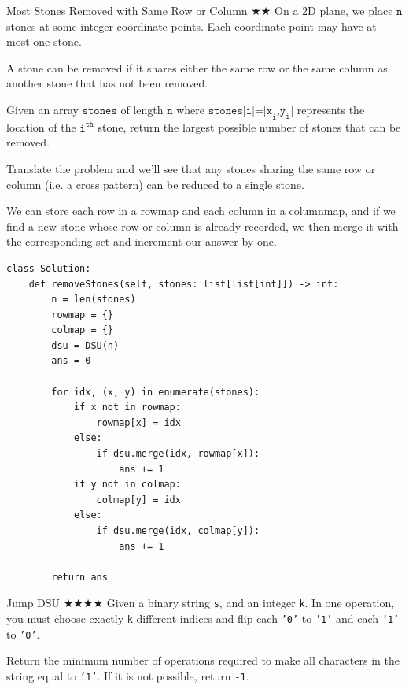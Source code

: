 \documentclass{article}
\begin{document}
\begin{Question}{Most Stones Removed with Same Row or Column $\bigstar\bigstar$}
On a 2D plane, we place $\texttt n$ stones at some integer coordinate points. Each coordinate point may have at most one stone.

A stone can be removed if it shares either the same row or the same column as another stone that has not been removed.

Given an array $\texttt{stones}$ of length $\texttt n$ where $\texttt{stones[i]=[x}_\texttt{i}\texttt{,y}_\texttt{i}\texttt{]}$ represents the location of the $\texttt i^{\texttt{th}}$ stone, return the largest possible number of stones that can be removed.
\end{Question}

Translate the problem and we'll see that any stones sharing the same row or column (i.e. a cross pattern) can be reduced to a single stone.

We can store each row in a rowmap and each column in a columnmap, and if we find a new stone whose row or column is already recorded, we then merge it with the corresponding set and increment our answer by one.

\begin{lstlisting}[style=python]
class Solution:
    def removeStones(self, stones: list[list[int]]) -> int:
        n = len(stones)
        rowmap = {}
        colmap = {}
        dsu = DSU(n)
        ans = 0
        
        for idx, (x, y) in enumerate(stones):
            if x not in rowmap:
                rowmap[x] = idx
            else:
                if dsu.merge(idx, rowmap[x]):
                    ans += 1
            if y not in colmap:
                colmap[y] = idx
            else:
                if dsu.merge(idx, colmap[y]):
                    ans += 1
                    
        return ans
\end{lstlisting}

\begin{Question}{Jump DSU $\bigstar\bigstar\bigstar\bigstar$}
Given a binary string \texttt{s}, and an integer \texttt{k}. In one operation, you must choose exactly \texttt{k} different indices and flip each \texttt{'0'} to \texttt{'1'} and each \texttt{'1'} to \texttt{'0'}.

Return the minimum number of operations required to make all characters in the string equal to \texttt{'1'}. If it is not possible, return \texttt{-1}.
\end{Question}
\end{document}
